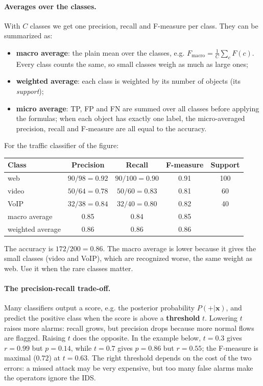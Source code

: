 \paragraph{Averages over the classes.} With $C$ classes we get one precision, recall and F-measure per class. They can be summarized as:
\begin{itemize}
    \item \textbf{macro average}: the plain mean over the classes, e.g. $F_{\text{macro}} = \frac{1}{C}\sum_{c} F(c)$. Every class counts the same, so small classes weigh as much as large ones;
    \item \textbf{weighted average}: each class is weighted by its number of objects (its \emph{support});
    \item \textbf{micro average}: TP, FP and FN are summed over all classes before applying the formulas; when each object has exactly one label, the micro-averaged precision, recall and F-measure are all equal to the accuracy.
\end{itemize}
For the traffic classifier of the figure:
\begin{center}
    \begin{tabular}{l|c|c|c|c}
        \textbf{Class} & \textbf{Precision} & \textbf{Recall} & \textbf{F-measure} & \textbf{Support} \\ \hline
        web   & $90/98 = 0.92$ & $90/100 = 0.90$ & 0.91 & 100 \\
        video & $50/64 = 0.78$ & $50/60 = 0.83$  & 0.81 & 60 \\
        VoIP  & $32/38 = 0.84$ & $32/40 = 0.80$  & 0.82 & 40 \\ \hline
        macro average    & 0.85 & 0.84 & 0.85 & \\
        weighted average & 0.86 & 0.86 & 0.86 & \\
    \end{tabular}
\end{center}
The accuracy is $172/200 = 0.86$. The macro average is lower because it gives the small classes (video and VoIP), which are recognized worse, the same weight as web. Use it when the rare classes matter.

\paragraph{The precision-recall trade-off.} Many classifiers output a score, e.g. the posterior probability $P(+|\mathbf{x})$, and predict the positive class when the score is above a \textbf{threshold} $t$. Lowering $t$ raises more alarms: recall grows, but precision drops because more normal flows are flagged. Raising $t$ does the opposite. In the example below, $t = 0.3$ gives $r = 0.99$ but $p = 0.14$, while $t = 0.7$ gives $p = 0.86$ but $r = 0.55$; the F-measure is maximal ($0.72$) at $t = 0.63$. The right threshold depends on the cost of the two errors: a missed attack may be very expensive, but too many false alarms make the operators ignore the IDS.

